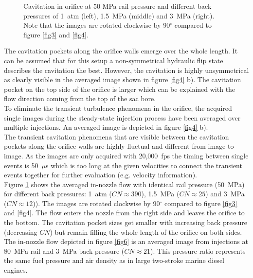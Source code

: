 \documentclass[letterpaper,twocolumn,10pt]{ilass}
\begin{document}
\begin{figure}[h]
\begin{center}
\end{center}
\vspace*{-2mm}
\caption{Cavitation in orifice at 50 MPa rail pressure and different back pressures of
         1~atm (left), 1.5~MPa (middle) and 3~MPa (right). Note that the images are
				 rotated clockwise by 90$^{\circ}$ compared to figure \ref{fig3} and \ref{fig4}.}
\label{fig5} 
\end{figure}


The cavitation pockets along the orifice walls emerge over the whole length. It can be assumed
that for this setup a non-symmetrical hydraulic flip state describes the cavitation the best.
However, the cavitation is highly unsymmetrical as clearly visible in the averaged image shown
in figure \ref{fig4} b). The cavitation pocket on the top side of the orifice is larger which
can be explained with the flow direction coming from the top of the sac bore.\\
%
To eliminate the transient turbulence phenomena in the orifice, the acquired single images
during the steady-state injection process have been averaged over multiple injections. An
averaged image is depicted in figure \ref{fig4} b).\\
%
The transient cavitation phenomena that are visible between the cavitation pockets along the
orifice walls are highly fluctual and different from image to image.  As the images are only
acquired with 20,000~fps the timing between single events is 50~$\mu$s which is too long at
the given velocities to connect the transient events together for further evaluation
(e.g. velocity information).\\
%
Figure \ref{fig5} shows the averaged in-nozzle flow with identical rail pressure (50~MPa)
for different back pressures: 1~atm ($CN \approx 390$), 1.5~MPa ($CN \approx 25$) and 3~MPa
($CN \approx 12$)). The images are rotated clockwise by 90$^{\circ}$ compared to figure
\ref{fig3} and \ref{fig4}. The flow enters the nozzle from the right side and leaves the
orifice to the bottom. The cavitation pocket sizes get smaller with increasing back pressure
(decreasing $CN$) but remain filling the whole length of the orifice on both sides.\\
%
The in-nozzle flow depicted in figure \ref{fig6} is an averaged image from injections at
80~MPa rail and 3~MPa back pressure ($CN \approx 21$). This pressure ratio represents the
same fuel pressure and air density as in large two-stroke marine diesel engines.\\
%
\end{document}
